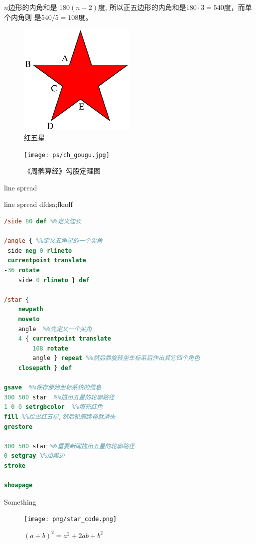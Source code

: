 \documentclass[main.tex]{subfiles}
\begin{document}
\begin{example} $n$边形的内角和是 $180(n-2)$度, 所以正五边形的内角和是$180\cdot 3 = 540$度，而单个内角则 是$540/5 = 108$度。
\end{example}

\begin{figure}[h]
	\centering
	\includegraphics[width=0.5\textwidth]{images/star.eps}
	\caption{红五星}
	\label{fig:III.1.2}
\end{figure}

\begin{figure}[h]
	\centering
	\texttt{[image: ps/ch\_gougu.jpg]}
	\caption{《周髀算经》勾股定理图}
	\label{fig:III.1.3}
\end{figure}

line spread

line spread
dfdsa;fkadf

\begin{spacing}{0.8}
\begin{lstlisting}[language=PostScript]
%!PS-Adobe-3.0
/side 80 def %%定义边长 

/angle { %%定义五角星的一个尖角   
 side neg 0 rlineto
 currentpoint translate
-36 rotate
	side 0 rlineto } def

/star {
	newpath
	moveto
	angle  %%先定义一个尖角
	4 { currentpoint translate
		108 rotate
		angle } repeat %%然后靠旋转坐车标系后作出其它四个角色
	closepath } def

gsave  %%保存原始坐标系统的信息
300 500 star  %%描出五星的轮廓路径
1 0 0 setrgbcolor  %%填充红色
fill %%绘出红五星,然后轮廓路径就消失
grestore

300 500 star %%重要新闻描出五星的轮廓路径
0 setgray %%加黑边
stroke

showpage
\end{lstlisting}
\end{spacing}



Something
\begin{figure}[h]
	\centering
	\texttt{[image: png/star\_code.png]}
	\caption{$(a+b)^2 = a^2 + 2ab + b^2$}
	\label{fig:III.1.3}
\end{figure}
\end{document}
